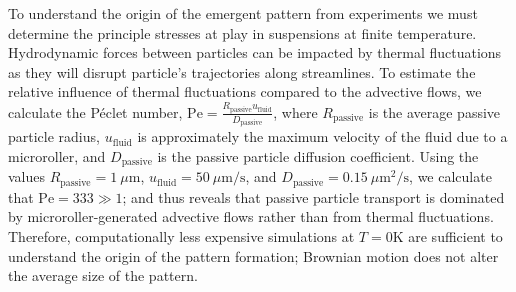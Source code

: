 \documentclass[12pt]{article}
\begin{document}

To understand the origin of the emergent pattern from experiments we must determine the principle stresses at play in suspensions at finite temperature. Hydrodynamic forces between particles can be impacted by thermal fluctuations as they will disrupt particle's trajectories along streamlines. To estimate the relative influence of thermal fluctuations compared to the advective flows, we calculate the P\'eclet number, $\mathrm{Pe} = \frac{R_\mathrm{passive} u_\mathrm{fluid}}{D_\mathrm{passive}}$, where $R_\mathrm{passive}$ is the average passive particle radius, $u_\mathrm{fluid}$ is approximately the maximum velocity of the fluid due to a microroller, and $D_\mathrm{passive}$ is the passive particle diffusion coefficient. Using the values $R_\mathrm{passive} = 1 \ \mu \mathrm{m}$, $u_\mathrm{fluid} = 50 \ \mu\mathrm{m}/\mathrm{s}$, and $D_\mathrm{passive} = 0.15 \ \mu \mathrm{m}^2/\mathrm{s}$, we calculate that $\mathrm{Pe} = 333 \gg 1$; and thus reveals that passive particle transport is dominated by microroller-generated advective flows rather than from thermal fluctuations. Therefore, computationally less expensive simulations at $T=0 \mathrm{K}$ are sufficient to understand the origin of the pattern formation; Brownian motion does not alter the average size of the pattern. 

\end{document}
